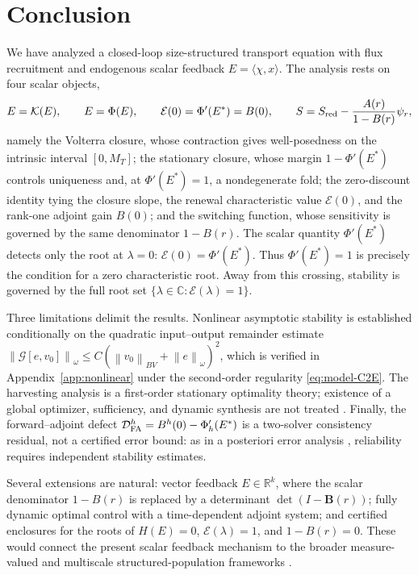 \documentclass[pdflatex,sn-mathphys-num]{sn-jnl}
\theoremstyle{thmstyleone}
\theoremstyle{definition}
\theoremstyle{remark}
\newcommand{\R}{\mathbb{R}}
\newcommand{\Kcal}{\mathcal{K}}
\newcommand{\Ev}{\mathcal{E}}
\newcommand{\Gcal}{\mathcal{G}}
\newcommand{\norm}[1]{\left\lVert#1\right\rVert}
\numberwithin{equation}{section}
\begin{document}
\section{Conclusion}
\label{sec:conclusion}
We have analyzed a closed-loop size-structured transport equation with flux
recruitment and endogenous scalar feedback $E=\langle\chi,x\rangle$. The analysis
rests on four scalar objects,
\[
E=\Kcal(E),\qquad E=\Phi(E),\qquad \Ev(0)=\Phi'(E^*)=B(0),
\qquad
S=S_{\rm red}-\frac{A(r)}{1-B(r)}\psi_r ,
\]
namely the Volterra closure, whose contraction gives well-posedness on the
intrinsic interval $[0,M_T]$; the stationary closure, whose margin
$1-\Phi'(E^*)$ controls uniqueness and, at $\Phi'(E^*)=1$, a nondegenerate fold;
the zero-discount identity tying the closure slope, the renewal characteristic
value $\Ev(0)$, and the rank-one adjoint gain $B(0)$; and the switching function,
whose sensitivity is governed by the same denominator $1-B(r)$. 
The scalar quantity \(\Phi'(E^*)\) detects only the root at \(\lambda=0\):
$\mathcal E(0)=\Phi'(E^*)$.
Thus
$\Phi'(E^*)=1$
is precisely the condition for a zero characteristic root. Away from this
crossing, stability is governed by the full root set
$\{\lambda\in\mathbb C:\mathcal E(\lambda)=1\}$.

Three limitations delimit the results. Nonlinear asymptotic stability is
established conditionally on the quadratic input--output remainder estimate
$\norm{\Gcal[e,v_0]}_\omega\le C(\norm{v_0}_{BV}+\norm{e}_\omega)^2$, which is
verified in Appendix~\ref{app:nonlinear} under the second-order regularity
\eqref{eq:model-C2E}. The harvesting analysis is a first-order stationary
optimality theory; existence of a global optimizer, sufficiency, and dynamic
synthesis are not treated \cite{anita2013analysis,yu2026chemotactic}. Finally, the forward--adjoint defect
$\mathcal D_{\rm FA}^h=B^h(0)-\Phi_h'(E^*)$ is a two-solver consistency residual,
not a certified error bound: as in a posteriori error analysis
\cite{verfurth2013posteriori,yu2026age}, reliability requires independent stability estimates.

Several extensions are natural: vector feedback $E\in\R^k$, where the scalar
denominator $1-B(r)$ is replaced by a determinant $\det(I-\mathbf B(r))$; fully
dynamic optimal control with a time-dependent adjoint system; and certified
enclosures for the roots of $H(E)=0$, $\Ev(\lambda)=1$, and $1-B(r)=0$. These
would connect the present scalar feedback mechanism to the broader measure-valued
and multiscale structured-population frameworks
\cite{michel2005general,thieme2018mathematics,yu2026fullcovariance}.
\end{document}
